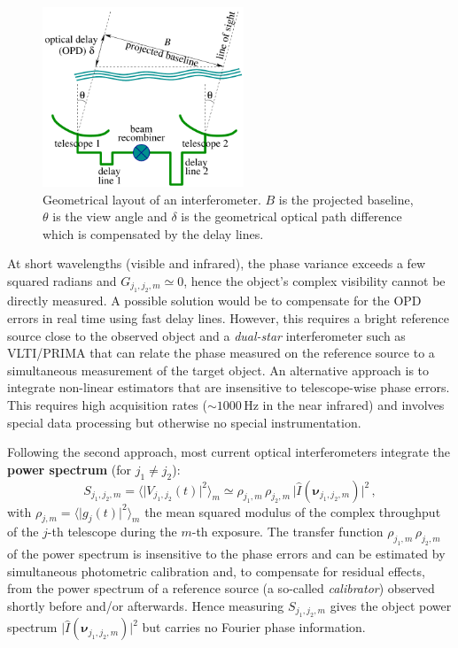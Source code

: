 \documentclass{article}
\newcommand{\vocab}[1]{\textbf{#1}}
\newcommand{\V}[1]{\boldsymbol{#1}}      %
\newcommand{\FT}[1]{\hat{#1}}            %
\newcommand{\abs}[1]{\vert #1\vert}
\newcommand{\avg}[1]{\langle #1\rangle}
\newcommand{\ComplexVis}{V}
\newcommand{\Powerspectrum}{S}
\newcommand{\Freq}{\nu}               %
\newcommand{\VFreq}{\V{\Freq}}
\newcommand{\Dirn}{\theta}            %
\newcommand{\Image}{I}
\newcommand{\Gain}{g}
\newcommand{\GainSquaredModulus}{\rho}
\newcommand{\OPD}{\delta}
\newcommand{\OTF}{G} %
\begin{document}
\begin{figure}[!t]
  \centering
  \includegraphics[width=60mm]{fig1}
  \caption{Geometrical layout of an interferometer. $B$ is the projected
    baseline, $\Dirn$ is the view angle and $\OPD$ is the geometrical optical
    path difference which is compensated by the delay lines.}
  \label{fig:layout}
\end{figure}

At short wavelengths (visible and infrared), the phase variance exceeds a few
squared radians and $\OTF_{j_1,j_2,m}\simeq0$, hence the object's complex
visibility cannot be directly measured.  A possible solution would be to
compensate for the OPD errors in real time using fast delay lines.  However,
this requires a bright reference source close to the observed object
and a \emph{dual-star} interferometer such as VLTI/PRIMA
\citep{Delplancke_at_al-2003-Prima} that can relate the phase measured on
the reference source to a simultaneous measurement of the target object. An
alternative approach is to integrate non-linear estimators that are
insensitive to telescope-wise phase errors.  This requires high acquisition
rates ($\sim1000\,\mathrm{Hz}$ in the near infrared) and involves special
data processing but otherwise no special instrumentation.

Following the second approach, most current optical interferometers integrate
the \vocab{power spectrum} (for $j_1\not=j_2$):
\begin{equation}
  \label{eq:mean-powerspectrum}
  \Powerspectrum_{j_1,j_2,m}
  = \avg{\abs{\ComplexVis_{j_1,j_2}(t)}^2}_m
  \simeq \GainSquaredModulus_{j_1,m} \,
         \GainSquaredModulus_{j_2,m} \,
         \abs{\FT{\Image}(\VFreq_{j_1,j_2,m})}^2 \,,
\end{equation}
with $\GainSquaredModulus_{j,m} = \avg{\abs{\Gain_{j}(t)}^2}_m$ the mean
squared modulus of the complex throughput of the $j$-th telescope during the
$m$-th exposure.  The transfer function $\GainSquaredModulus_{j_1,m} \,
\GainSquaredModulus_{j_2,m}$ of the power spectrum is insensitive to the phase
errors and can be estimated by simultaneous photometric calibration and, to
compensate for residual effects, from the power spectrum of a reference source
(a so-called \emph{calibrator}) observed shortly before and/or afterwards.
Hence measuring $\Powerspectrum_{j_1,j_2,m}$ gives the object power spectrum
$\abs{\FT{\Image}(\VFreq_{j_1,j_2,m})}^2$ but carries no Fourier phase
information.
\end{document}
